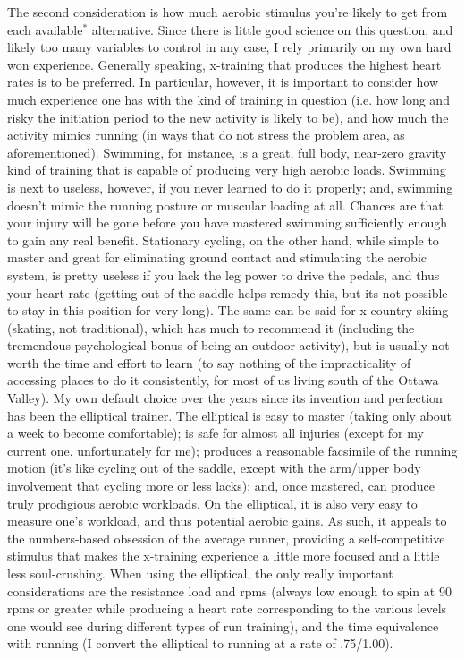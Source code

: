 The second consideration is how much aerobic stimulus you're likely to get from each available$^*$ alternative. Since there is little good science on this question, and likely too many variables to control in any case, I rely primarily on my own hard won experience. Generally speaking, x-training that produces the highest heart rates is to be preferred. In particular, however, it is important to consider how much experience one has with the kind of training in question (i.e. how long and risky the initiation period to the new activity is likely to be), and how much the activity mimics running (in ways that do not stress the problem area, as aforementioned). Swimming, for instance, is a great, full body, near-zero gravity kind of training that is capable of producing very high aerobic loads. Swimming is next to useless, however, if you never learned to do it properly; and, swimming doesn't mimic the running posture or muscular loading at all. Chances are that your injury will be gone before you have mastered swimming sufficiently enough to gain any real benefit. Stationary cycling, on the other hand, while simple to master and great for eliminating ground contact and stimulating the aerobic system, is pretty useless if you lack the leg power to drive the pedals, and thus your heart rate (getting out of the saddle helps remedy this, but its not possible to stay in this position for very long). The same can be said for x-country skiing (skating, not traditional), which has much to recommend it (including the tremendous psychological bonus of being an outdoor activity), but is usually not worth the time and effort to learn (to say nothing of the impracticality of accessing places to do it consistently, for most of us living south of the Ottawa Valley). My own default choice over the years since its invention and perfection has been the elliptical trainer. The elliptical is easy to master (taking only about a week to become comfortable); is safe for almost all injuries (except for my current one, unfortunately for me); produces a reasonable facsimile of the running motion (it's like cycling out of the saddle, except with the arm/upper body involvement that cycling more or less lacks); and, once mastered, can produce truly prodigious aerobic workloads. On the elliptical, it is also very easy to measure one's workload, and thus potential aerobic gains. As such, it appeals to the numbers-based obsession of the average runner, providing a self-competitive stimulus that makes the x-training experience a little more focused and a little less soul-crushing. When using the elliptical, the only really important considerations are the resistance load and rpms (always low enough to spin at 90 rpms or greater while producing a heart rate corresponding to the various levels one would see during different types of run training), and the time equivalence with running (I convert the elliptical to running at a rate of .75/1.00).

